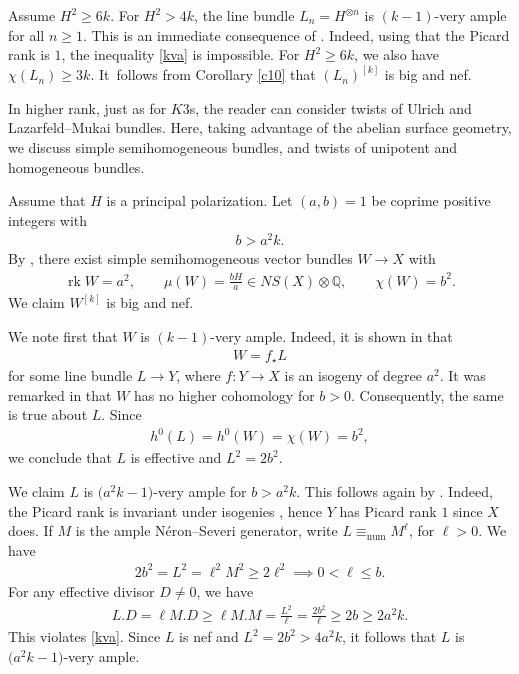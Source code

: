 \documentclass[pdftex]{sigma}
\numberwithin{equation}{section}
\newcommand{\rk}{\operatorname{rk}}
\begin{document}
\begin{Example}%
Assume $H^2\geq 6k$. For $H^2>4k$, the line bundle $L_n=H^{\otimes n}$ is $(k-1)$-very ample for all $n\geq 1$. This is an immediate consequence of \cite[Theorem 2.1]{BS}. Indeed, using that the Picard rank is $1$, the inequality \eqref{kva} is impossible. For $H^2\geq 6k$, we also have $\chi(L_n)\geq 3k$. It~follows from Corollary \ref{c10} that $(L_n)^{[k]}$ is big and nef.
\end{Example}

In higher rank, just as for $K3$s, the reader can consider twists of Ulrich and Lazarfeld--Mukai bundles. Here, taking advantage of the abelian surface geometry, we discuss simple semihomogeneous bundles, and twists of unipotent and homogeneous bundles.
\begin{Example}%
 Assume that $H$ is a principal polarization. Let $(a, b)=1$ be coprime positive integers with
 \begin{gather*}
 b>a^2k.
 \end{gather*}
 By \cite[Remark 7.13]{M}, there exist simple semihomogeneous vector bundles $W\to X$ with
 {\samepage\begin{gather*}
 \rk W=a^2, \qquad \mu(W)=\frac{bH}{a}\in NS(X)\otimes \mathbb Q, \qquad \chi(W)=b^2.
 \end{gather*}
 We claim $W^{[k]}$ is big and nef.}

We note first that $W$ is $(k-1)$-very ample. Indeed, it is shown in \cite[Theorem 5.8] {M} that
\begin{gather*}
W=f_{\star} L
\end{gather*}
for some line bundle $L\to Y$, where $f\colon Y\to X$ is an isogeny of degree $a^2$. It was remarked in \cite[Section 2.4]{Op} that $W$ has no higher cohomology for $b>0$. Consequently, the same is true about $L$. Since
\begin{gather*}
h^0(L)=h^0(W)=\chi(W)=b^2,
\end{gather*}
we conclude that $L$ is effective and $L^2=2b^2$.

We claim $L$ is $\big(a^2k-1\big)$-very ample for $b>a^2k$. This follows again by \cite[Theorem 2.1]{BS}. Indeed, the Picard rank is invariant under isogenies \cite[Proposition~3.2]{BL}, hence $Y$ has Picard rank $1$ since $X$ does. If $M$ is the ample N\'eron--Severi generator, write $L\equiv_{\text{num}} M^{\ell}$, for $\ell> 0$. We have
\begin{gather*}
2b^2=L^2=\ell^2 M^2\geq 2\ell^2\implies 0< \ell \leq b.
\end{gather*}
For any effective divisor $D\neq 0$, we have
\begin{gather*}
L.D= \ell M.D\geq \ell M.M=\frac{L^2}{\ell}=\frac{2b^2}{\ell}\geq 2b\geq 2a^2k.
\end{gather*}
This violates \eqref{kva}. Since $L$ is nef and $L^2=2b^2>4a^2k$, it follows that $L$ is $\big(a^2k-1\big)$-very ample.


\end{Example}
\end{document}
